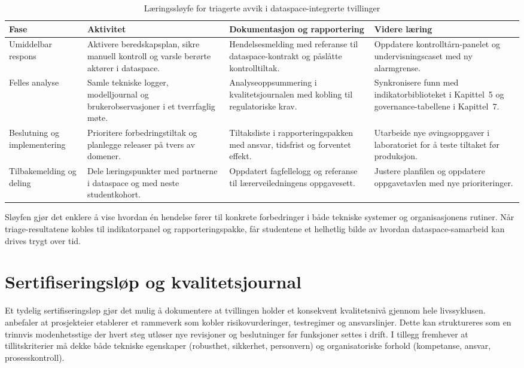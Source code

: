 \begin{table}[ht]
    \centering
    \caption{Læringssløyfe for triagerte avvik i dataspace-integrerte tvillinger}
    \label{tab:triage-laringssloyfe}
    \begin{tabular}{|p{3.3cm}|p{4.8cm}|p{4.6cm}|p{3.0cm}|}
        \hline
        \textbf{Fase} & \textbf{Aktivitet} & \textbf{Dokumentasjon og rapportering} & \textbf{Videre læring} \\
        \hline
        Umiddelbar respons & Aktivere beredskapsplan, sikre manuell kontroll og varsle berørte aktører i dataspace. & Hendelsesmelding med referanse til dataspace-kontrakt og påslåtte kontrolltiltak. & Oppdatere kontrolltårn-panelet og undervisningscaset med ny alarmgrense. \\
        \hline
        Felles analyse & Samle tekniske logger, modelljournal og brukerobservasjoner i et tverrfaglig møte. & Analyseoppsummering i kvalitetsjournalen med kobling til regulatoriske krav. & Synkronisere funn med indikatorbiblioteket i Kapittel~5 og governance-tabellene i Kapittel~7. \\
        \hline
        Beslutning og implementering & Prioritere forbedringstiltak og planlegge releaser på tvers av domener. & Tiltaksliste i rapporteringspakken med ansvar, tidsfrist og forventet effekt. & Utarbeide nye øvingsoppgaver i laboratoriet for å teste tiltaket før produksjon. \\
        \hline
        Tilbakemelding og deling & Dele læringspunkter med partnerne i dataspace og med neste studentkohort. & Oppdatert fagfellelogg og referanse til lærerveiledningens oppgavesett. & Justere planfilen og oppdatere oppgavetavlen med nye prioriteringer. \\
        \hline
    \end{tabular}
\end{table}

Sløyfen gjør det enklere å vise hvordan én hendelse fører til konkrete forbedringer i både tekniske systemer og organisasjonens rutiner. Når triage-resultatene kobles til indikatorpanel og rapporteringspakke, får studentene et helhetlig bilde av hvordan dataspace-samarbeid kan drives trygt over tid.

\section{Sertifiseringsløp og kvalitetsjournal}
Et tydelig sertifiseringsløp gjør det mulig å dokumentere at tvillingen holder et konsekvent kvalitetsnivå gjennom hele livssyklusen. \citet{dnv2023digitalassurance} anbefaler at prosjekteier etablerer et rammeverk som kobler risikovurderinger, testregimer og ansvarslinjer. Dette kan struktureres som en trinnvis modenhetsstige der hvert steg utløser nye revisjoner og beslutninger før funksjoner settes i drift. I tillegg fremhever \citet{iso2020tr24028} at tillitskriterier må dekke både tekniske egenskaper (robusthet, sikkerhet, personvern) og organisatoriske forhold (kompetanse, ansvar, prosesskontroll).

